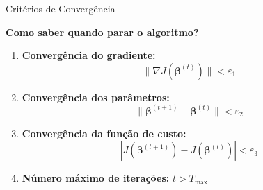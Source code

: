 \documentclass[xcolor=dvipsnames,t,aspectratio=169]{beamer} %
\begin{document}
\begin{frame}[c]{Critérios de Convergência}
    
    \textbf{Como saber quando parar o algoritmo?}
    
    \begin{enumerate}
        \item \textbf{Convergência do gradiente:}
        \begin{equation}
            \|\nabla J(\boldsymbol{\beta}^{(t)})\| < \varepsilon_1
        \end{equation}
        
        \item \textbf{Convergência dos parâmetros:}
        \begin{equation}
            \|\boldsymbol{\beta}^{(t+1)} - \boldsymbol{\beta}^{(t)}\| < \varepsilon_2
        \end{equation}
        
        \item \textbf{Convergência da função de custo:}
        \begin{equation}
            |J(\boldsymbol{\beta}^{(t+1)}) - J(\boldsymbol{\beta}^{(t)})| < \varepsilon_3
        \end{equation}
        
        \item \textbf{Número máximo de iterações:} $t > T_{\max}$
    \end{enumerate}

\end{frame}
\end{document}
